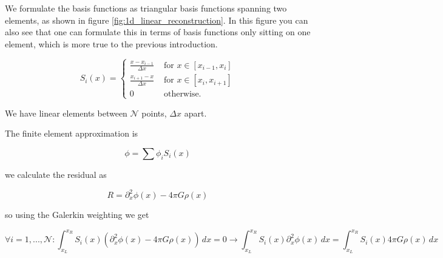 We formulate the basis functions as triangular basis functions spanning two elements, as
shown in figure \ref{fig:1d_linear_reconstruction}. In this figure you can also see
that one can formulate this in terms of basis functions only sitting on one element,
which is more true to the previous introduction.

\begin{equation}
    S_i(x)=\left\{\begin{array}{cc}
    \frac{x-x_{i-1}}{\Delta x} & \text { for } x \in\left[x_{i-1}, x_i\right] \\
    \frac{x_{i+1}-x}{\Delta x} & \text { for } x \in\left[x_i, x_{i+1}\right] \\
    0 & \text { otherwise. }
    \end{array}\right.
\end{equation}

We have linear elements between $\mathcal{N}$ points, $\Delta x$ apart.

The finite element approximation is

\begin{equation}
    \phi = \sum \phi_i S_i(x)
\end{equation}

we calculate the residual as

\begin{equation}
    R = \partial_x^2 \phi(x) - 4\pi G \rho(x)
\end{equation}

so using the Galerkin weighting we get

\begin{equation}
    \forall i=1,...,\mathcal{N}: \int_{x_L}^{x_R} S_i(x) \left( \partial_x^2 \phi(x) - 4\pi G \rho(x) \right) \, dx = 0 \rightarrow \int_{x_L}^{x_R} S_i(x) \partial_x^2 \phi(x) \, dx = \int_{x_L}^{x_R} S_i(x) 4\pi G \rho(x) \, dx
\end{equation}

